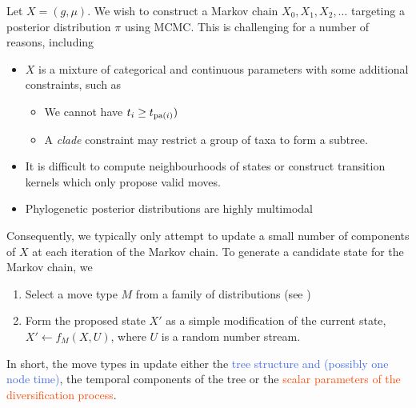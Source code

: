 \documentclass[11pt,a4paper]{article}
\begin{document}
Let $ X = (g, \mu) $. We wish to construct a Markov chain $ X_0, X_1, X_2, \dotsc $ targeting a posterior distribution $ \pi $ using MCMC. This is challenging for a number of reasons, including
\begin{itemize}
    \item $ X $ is a mixture of categorical and continuous parameters with some additional constraints, such as
    \begin{itemize}
        \item We cannot have $ t_i \geq t_{\operatorname*{\mathrm{pa}}(i)}) $
        \item A \emph{clade} constraint may restrict a group of taxa to form a subtree.
    \end{itemize}
    \item It is difficult to compute neighbourhoods of states or construct transition kernels which only propose valid moves.
    \item Phylogenetic posterior distributions are highly multimodal \citep{whidden15,whidden19}
\end{itemize}
Consequently, we typically only attempt to update a small number of components of $ X $ at each iteration of the Markov chain. To generate a candidate state for the Markov chain, we
\begin{enumerate}
    \item Select a move type $ M $ from a family of distributions (see )
    \item Form the proposed state $ X' $ as a simple modification of the current state, $ X' \leftarrow f_M(X, U) $, where $ U $ is a random number stream.
\end{enumerate}
In short, the move types in  update either the \textcolor{RoyalBlue}{tree structure and (possibly one node time)}, the \textcolor{YellowOrange}{temporal components of the tree} or the \textcolor{OrangeRed}{scalar parameters of the diversification process}.
\end{document}
